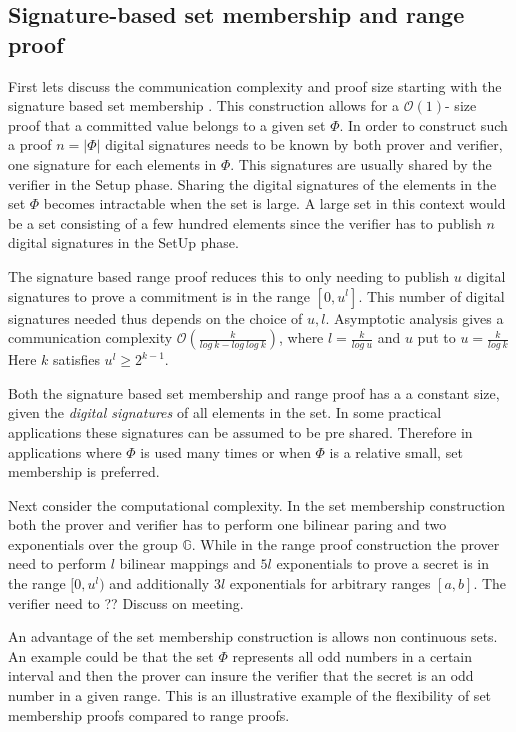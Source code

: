 \subsection{Signature-based set membership and range proof}

First lets discuss the communication complexity and proof size starting with the signature based set membership . This construction allows for a $\mathcal{O}(1)$- size proof that a committed value belongs to a given set $\Phi$. In order to construct such a proof $n=|\Phi|$ digital signatures needs to be known by both prover and verifier, one signature for each elements in $\Phi$. This signatures are usually shared by the verifier in the Setup phase. Sharing the digital signatures of the elements in the set $\Phi$ becomes intractable when the set is large.  A large set in this context would be a set consisting of a few hundred elements since the verifier has to publish $n$ digital signatures in the SetUp phase. 

The signature based range proof reduces this to only needing to publish $u$ digital signatures to prove a commitment is in the range $[0,u^l]$. 
This number of digital signatures needed thus depends on the choice of $u,l$. Asymptotic analysis gives a communication complexity $\mathcal{O}(\frac{k}{log\:k-log\:log\:k})$, where $l=\frac{k}{log\:u}$ and $u$ put to $u=\frac{k}{log\: k}$ Here $k$ satisfies $u^l \geq 2^{k-1}$.

Both the signature based set membership and range proof has a a constant size, given the \textit{digital signatures} of all elements in the set. In some practical applications these signatures can be assumed to be pre shared. Therefore in applications where $\Phi$ is used many times  or when $\Phi$ is a relative small, set membership is preferred.

Next consider the computational complexity.  In the set membership construction both the prover and verifier has to perform one bilinear paring and two  exponentials over the group $\mathds{G}$. While in the range proof construction the prover need to perform $l$ bilinear mappings and $5l$ exponentials to prove a secret is in the range $[0,u^l)$ and additionally $3l$ exponentials for arbitrary ranges $[a,b]$. The verifier need to ?? Discuss on meeting.
 
An advantage of the set membership construction is allows non continuous sets. An example could be that the set $\Phi$ represents all odd numbers in a certain interval and then the prover can insure the verifier that the secret is an odd number in a given range. This is an illustrative example of the flexibility of set membership proofs compared to range proofs.

